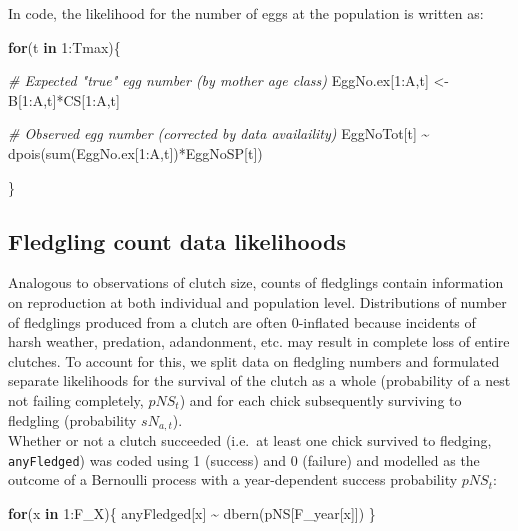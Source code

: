 \documentclass[
]{book}
\newenvironment{Shaded}{\begin{snugshade}}{\end{snugshade}}
\newcommand{\CommentTok}[1]{\textcolor[rgb]{0.56,0.35,0.01}{\textit{#1}}}
\newcommand{\ControlFlowTok}[1]{\textcolor[rgb]{0.13,0.29,0.53}{\textbf{#1}}}
\newcommand{\DecValTok}[1]{\textcolor[rgb]{0.00,0.00,0.81}{#1}}
\newcommand{\FunctionTok}[1]{\textcolor[rgb]{0.00,0.00,0.00}{#1}}
\newcommand{\NormalTok}[1]{#1}
\newcommand{\OtherTok}[1]{\textcolor[rgb]{0.56,0.35,0.01}{#1}}
\newcommand{\SpecialCharTok}[1]{\textcolor[rgb]{0.00,0.00,0.00}{#1}}
\begin{document}
In code, the likelihood for the number of eggs at the population is written as:

\begin{Shaded}
\begin{Highlighting}[]
\ControlFlowTok{for}\NormalTok{(t }\ControlFlowTok{in} \DecValTok{1}\SpecialCharTok{:}\NormalTok{Tmax)\{}

    \CommentTok{\# Expected "true" egg number (by mother age class)}
\NormalTok{    EggNo.ex[}\DecValTok{1}\SpecialCharTok{:}\NormalTok{A,t] }\OtherTok{\textless{}{-}}\NormalTok{ B[}\DecValTok{1}\SpecialCharTok{:}\NormalTok{A,t]}\SpecialCharTok{*}\NormalTok{CS[}\DecValTok{1}\SpecialCharTok{:}\NormalTok{A,t]}

    \CommentTok{\# Observed egg number (corrected by data availaility)}
\NormalTok{    EggNoTot[t] }\SpecialCharTok{\textasciitilde{}} \FunctionTok{dpois}\NormalTok{(}\FunctionTok{sum}\NormalTok{(EggNo.ex[}\DecValTok{1}\SpecialCharTok{:}\NormalTok{A,t])}\SpecialCharTok{*}\NormalTok{EggNoSP[t])}

\NormalTok{\}}
\end{Highlighting}
\end{Shaded}

\hypertarget{fledgling-count-data-likelihoods}{%
\subsection{Fledgling count data likelihoods}\label{fledgling-count-data-likelihoods}}

Analogous to observations of clutch size, counts of fledglings contain
information on reproduction at both individual and population level.
Distributions of number of fledglings produced from a clutch are often 0-inflated
because incidents of harsh weather, predation, adandonment, etc. may result in
complete loss of entire clutches. To account for this, we split data on fledgling
numbers and formulated separate likelihoods for the survival of the clutch as
a whole (probability of a nest not failing completely, \(pNS_t\)) and for each
chick subsequently surviving to fledgling (probability \(sN_{a,t}\)).\\
Whether or not a clutch succeeded (i.e.~at least one chick survived to fledging,
\texttt{anyFledged}) was coded using 1 (success) and 0 (failure) and modelled as the
outcome of a Bernoulli process with a year-dependent success probability \(pNS_t\):

\begin{Shaded}
\begin{Highlighting}[]
\ControlFlowTok{for}\NormalTok{(x }\ControlFlowTok{in} \DecValTok{1}\SpecialCharTok{:}\NormalTok{F\_X)\{}
\NormalTok{  anyFledged[x] }\SpecialCharTok{\textasciitilde{}} \FunctionTok{dbern}\NormalTok{(pNS[F\_year[x]])}
\NormalTok{\}}
\end{Highlighting}
\end{Shaded}
\end{document}
